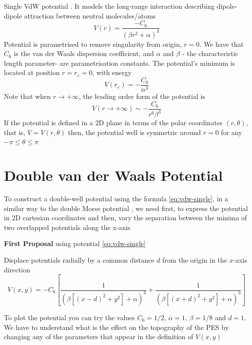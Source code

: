 \documentclass[10pt,aps,onecolumn,superscriptaddress]{revtex4-2}
\begin{document}
Single VdW potential \cite{Soley2018}. It models the long-range interaction describing dipole-dipole attraction between neutral molecules/atoms
\begin{equation}
    V(r) = \frac{- C_6}{(\beta r^2 + \alpha)^3}
    \label{eq:vdw-single}
\end{equation}
Potential is parametrised to remove singularity from origin, $r = 0$. We have that $C_6$ is the van der Waals dispersion coefficient, and $\alpha$ and $\beta$  - the characteristic length parameter- are parametrisation constants. The potential's minimum is located at position $r = r_e = 0$, with energy 
\begin{equation}
    V\left( r_e \right) = - \frac{C_6}{\alpha^3}
\end{equation}
Note that when $r \longrightarrow +\infty $, the leading order form of the potential is
\begin{equation}
    V(r \longrightarrow +\infty) \sim - \frac{C_6}{r^6 \beta^3}
\end{equation}
If the potential is defined in a 2D plane in terms of the polar coordinates $(r, \theta)$, that is, $V = V(r, \theta)$ then, the potential well is symmetric around $r = 0$ for any $ -\pi \leq \theta \leq \pi$

\section{Double van der Waals Potential}

To construct a double-well potential using the formula \eqref{eq:vdw-single}, in a similar way to the double Morse potential \cite{GonzalezMontoya2020}, we need first, to express the potential in 2D cartesian coordinates and then, vary the separation between the minima of two overlapped potentials along the x-axis

\textbf{First Proposal} using potential \eqref{eq:vdw-single}

Displace potentials radially by a common distance $d$ from the origin in the $x$-axis direction
\begin{equation}
    V(x, y) = -C_6 \left[ \dfrac{1}{\left(\beta\left[\left(x - d\right)^2 + y^2\right] + \alpha\right)^3} + \dfrac{1}{\left(\beta\left[\left(x + d\right)^2 + y^2\right] + \alpha\right)^3} \right]
    \label{eq:vdw-double}
\end{equation}

To plot the potential you can try the values $C_6 = 1/2$, $\alpha = 1$, $\beta = 1/8$ and $d = 1$. We have to understand what is the effect on the topography of the PES by changing any of the parameters that appear in the definition of $V(x,y)$
\end{document}
